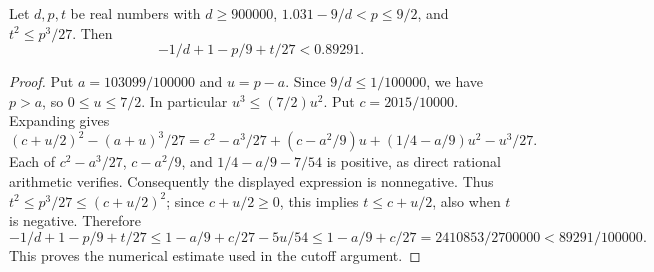 \begin{helper}
Let $d,p,t$ be real numbers with $d\ge900000$,
$1.031-9/d<p\le9/2$, and $t^2\le p^3/27$. Then
\[
-1/d+1-p/9+t/27<0.89291.
\]
\end{helper}
\begin{proof}
Put $a=103099/100000$ and $u=p-a$. Since $9/d\le1/100000$,
we have $p>a$, so $0\le u\le7/2$. In particular
$u^3\le(7/2)u^2$. Put $c=2015/10000$. Expanding gives
\[
(c+u/2)^2-(a+u)^3/27
=c^2-a^3/27+(c-a^2/9)u+(1/4-a/9)u^2-u^3/27.
\]
Each of $c^2-a^3/27$, $c-a^2/9$, and
$1/4-a/9-7/54$ is positive, as direct rational arithmetic verifies.
Consequently the displayed expression is nonnegative. Thus
$t^2\le p^3/27\le(c+u/2)^2$; since $c+u/2\ge0$, this implies
$t\le c+u/2$, also when $t$ is negative. Therefore
\[
-1/d+1-p/9+t/27
\le1-a/9+c/27-5u/54
\le1-a/9+c/27
=2410853/2700000<89291/100000.
\]
This proves the numerical estimate used in the cutoff argument.
\end{proof}
